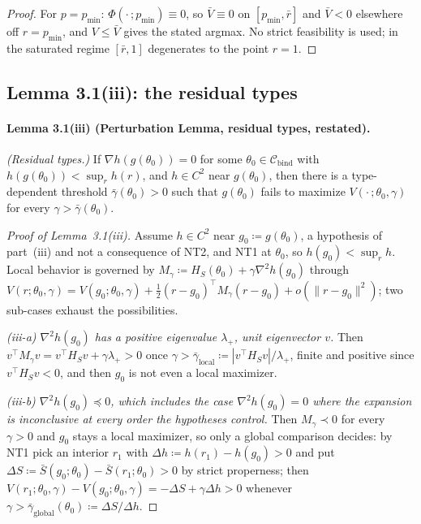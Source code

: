 \documentclass[acmsmall,nonacm,screen]{acmart}
\theoremstyle{acmplain}%
\theoremstyle{acmdefinition}%
\newcommand{\Cbind}{\mathcal{C}_{\mathrm{bind}}}
\newcommand{\Sbar}{\bar{S}}
\numberwithin{equation}{section}
\begin{document}
\begin{appendix}
\begin{proof}
For $p = p_{\min}$: $\Phi(\cdot\,;p_{\min}) \equiv 0$, so $\bar V \equiv 0$ on $[p_{\min},\bar r]$ and $\bar V < 0$ elsewhere off $r = p_{\min}$, and $V \le \bar V$ gives the stated argmax. No strict feasibility is used; in the saturated regime $[\bar r,1]$ degenerates to the point $r = 1$.
\end{proof}


\subsection{Lemma 3.1(iii): the residual types}

\paragraph*{Lemma 3.1(iii) (Perturbation Lemma, residual types, restated).}
\emph{(Residual types.)} If $\nabla h(g(\theta_0)) = 0$ for some $\theta_0 \in \Cbind$ with $h(g(\theta_0)) < \sup_r h(r)$, and $h \in C^2$ near $g(\theta_0)$, then there is a type-dependent threshold $\bar\gamma(\theta_0) > 0$ such that $g(\theta_0)$ fails to maximize $V(\cdot\,;\theta_0,\gamma)$ for every $\gamma > \bar\gamma(\theta_0)$.

\begin{proof}[Proof of Lemma~3.1(iii)]
Assume $h\in C^2$ near $g_0\coloneqq g(\theta_0)$, a hypothesis of part~(iii) and not a consequence of NT2, and NT1 at $\theta_0$, so $h(g_0)<\sup_rh$. Local behavior is governed by $M_\gamma\coloneqq H_S(\theta_0)+\gamma\nabla^2h(g_0)$ through $V(r;\theta_0,\gamma)=V(g_0;\theta_0,\gamma)+\tfrac12(r-g_0)^\top M_\gamma(r-g_0)+o(\|r-g_0\|^2)$; two sub-cases exhaust the possibilities.

\emph{(iii-a) $\nabla^2h(g_0)$ has a positive eigenvalue $\lambda_+$, unit eigenvector $v$.} Then $v^\top M_\gamma v=v^\top H_Sv+\gamma\lambda_+>0$ once $\gamma>\bar\gamma_{\mathrm{local}}\coloneqq|v^\top H_Sv|/\lambda_+$, finite and positive since $v^\top H_Sv<0$, and then $g_0$ is not even a local maximizer.

\emph{(iii-b) $\nabla^2h(g_0)\preceq0$, which includes the case $\nabla^2h(g_0)=0$ where the expansion is inconclusive at every order the hypotheses control.} Then $M_\gamma\prec0$ for every $\gamma>0$ and $g_0$ stays a local maximizer, so only a global comparison decides: by NT1 pick an interior $r_1$ with $\Delta h\coloneqq h(r_1)-h(g_0)>0$ and put $\Delta S\coloneqq\Sbar(g_0;\theta_0)-\Sbar(r_1;\theta_0)>0$ by strict properness; then $V(r_1;\theta_0,\gamma)-V(g_0;\theta_0,\gamma)=-\Delta S+\gamma\Delta h>0$ whenever $\gamma>\bar\gamma_{\mathrm{global}}(\theta_0)\coloneqq\Delta S/\Delta h$.


\end{proof}
\end{appendix}
\end{document}
